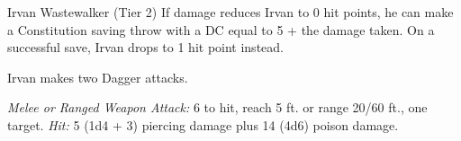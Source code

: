 \documentclass[10pt,a4paper,twoside,bg=print,twocolumn,openany,nodeprecatedcode]{dndbook}
\begin{document}
\begin{DndMonster}[float=t]{Irvan Wastewalker (Tier 2)}
\DndMonsterBasics[
armor-class = {15 (studded leather armor)},
hit-points = {\DndDice{18d8 + 18}},
speed = {40 ft.}
]
\DndMonsterAbilityScores[
 str = 10,
 dex = 16,
 con = 12,
 int = 14,
 wis = 14,
 cha = 14
]
\DndMonsterDetails[
saving-throws = {Dex +6, Con +4},
skills = {Acrobatics +6, Deception +5, Stealth +9, Survival +5},
languages = {Common, Goblin},
challenge = 5,
]
If damage reduces Irvan to 0 hit points, he can make a Constitution saving throw with a DC equal to 5 + the damage taken. On a successful save, Irvan drops to 1 hit point instead.

Irvan makes two Dagger attacks.

\textsl{Melee or Ranged Weapon Attack:} 6 to hit, reach 5 ft. or range 20/60 ft., one target. \textsl{Hit:} 5 (1d4 + 3) piercing damage plus 14 (4d6) poison damage.

\end{DndMonster}
\end{document}
